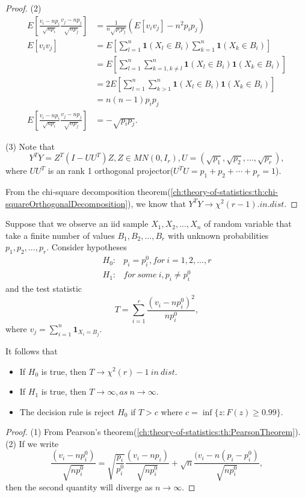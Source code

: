 \begin{refsection}
\begin{proof}
	(2)
	\begin{align*}
	E[\frac{v_i - np_i}{\sqrt{np_i}}\frac{v_j - np_j}{\sqrt{np_j}}] &= \frac{1}{n\sqrt{p_ip_j}}(E[v_iv_j] - n^2p_ip_j) \\
	E[v_iv_j] &= E[\sum_{l=1}^n \bm{1}(X_l\in B_i)\sum_{k=1}^n \bm{1}(X_k\in B_i)] \\
	&=E[\sum_{l=1}^n \sum_{k=1,k\neq l}^n\bm{1}(X_l\in B_i) \bm{1}(X_k\in B_i)] \\
	&=2E[\sum_{l=1}^n \sum_{k>1}^n\bm{1}(X_l\in B_i) \bm{1}(X_k\in B_i)] \\
	&=n(n-1)p_ip_j \\
	E[\frac{v_i - np_i}{\sqrt{np_i}}\frac{v_j - np_j}{\sqrt{np_j}}] & = -\sqrt{p_ip_j}.
	\end{align*}
	
	(3) Note that
	$$Y^TY = Z^T(I - UU^T)Z, Z\in MN(0,I_r), U = (\sqrt{p_1},\sqrt{p_2},...,\sqrt{p_r}),$$
	where $UU^T$ is an rank 1 orthogonal projector($U^TU = p_1+p_2+\cdots + p_r = 1$). 
	
	From the chi-square decomposition theorem(\autoref{ch:theory-of-statistics:th:chi-squareOrthogonalDecomposition}), we know that $Y^TY \to \chi^2(r-1) .in.dist$.
\end{proof}


\begin{theorem}\label{ch:theory-of-statistics:th:Chi-squareGoodnessOfFitTest}
	Suppose that we observe an iid sample $X_1,X_2,...,X_n$ of random variable that take a finite number of values $B_1,B_2,...,B_r$ with unknown probabilities $p_1,p_2,...,p_r$. Consider hypotheses
	\begin{align*}
	H_0:& p_i = p_i^0, for~ i=1,2,...,r \\
	H_1:& for~some~i, p_i \neq p_i^0 
	\end{align*}	
	and the test statistic
	$$T = \sum_{i=1}^r \frac{(v_i - np_i^0)^2}{np_i^0},$$
	where $v_j = \sum_{i=1}^n \bm{1}_{X_i = B_j}.$
	
	It follows that
	\begin{itemize}
		\item If $H_0$ is true, then $T\to \chi^2(r)-1 ~in~dist$.
		\item If $H_1$ is true, then $T\to \infty, as ~ n\to \infty$.
		\item The decision rule is reject $H_0$ if $T > c$ where $c = \inf\{z:F(z)\geq 0.99\}.$
	\end{itemize}
\end{theorem}
\begin{proof}
	(1) From Pearson's theorem(\autoref{ch:theory-of-statistics:th:PearsonTheorem}). (2) If we write
	$$\frac{(v_i - np_i^0)}{\sqrt{np_i^0}} = \sqrt{\frac{p_i}{p_i^0}}\frac{(v_i - np_i)}{\sqrt{np_i^0}} + \sqrt{n}\frac{(v_i - n(p_i-p_i^0)}{\sqrt{np_i^0}},$$
	then the second quantity will diverge as $n\to \infty$.
\end{proof}



\end{refsection}

